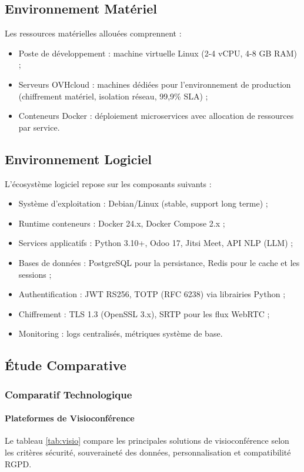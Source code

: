 \subsection{Environnement Matériel}
Les ressources matérielles allouées comprennent :
\begin{itemize}
    \item Poste de développement : machine virtuelle Linux (2-4 vCPU, 4-8 GB RAM) ;
    \item Serveurs OVHcloud : machines dédiées pour l'environnement de production (chiffrement matériel, isolation réseau, 99,9\% SLA) ;
    \item Conteneurs Docker : déploiement microservices avec allocation de ressources par service.
\end{itemize}

\subsection{Environnement Logiciel}
L'écosystème logiciel repose sur les composants suivants :
\begin{itemize}
    \item Système d'exploitation : Debian/Linux (stable, support long terme) ;
    \item Runtime conteneurs : Docker 24.x, Docker Compose 2.x ;
    \item Services applicatifs : Python 3.10+, Odoo 17, Jitsi Meet, API NLP (LLM) ;
    \item Bases de données : PostgreSQL pour la persistance, Redis pour le cache et les sessions ;
    \item Authentification : JWT RS256, TOTP (RFC 6238) via librairies Python ;
    \item Chiffrement : TLS 1.3 (OpenSSL 3.x), SRTP pour les flux WebRTC ;
    \item Monitoring : logs centralisés, métriques système de base.
\end{itemize}

\subsection{Étude Comparative}

\subsubsection{Comparatif Technologique}

\paragraph{Plateformes de Visioconférence}
Le tableau \ref{tab:visio} compare les principales solutions de visioconférence selon les critères sécurité, souveraineté des données, personnalisation et compatibilité RGPD.

